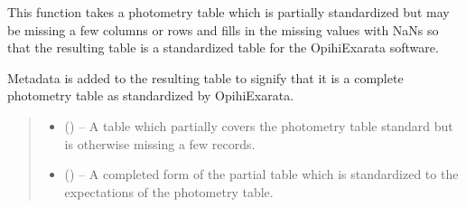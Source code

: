 \documentclass[letterpaper,11pt,english]{sphinxmanual}
\begin{document}
\begin{savenotes}\begin{fulllineitems}
\label{\detokenize{code/opihiexarata.library.phototable:opihiexarata.library.phototable.fill_incomplete_photometry_table}}
\pysigstartsignatures
{}
\pysigstopsignatures
\sphinxAtStartPar
This function takes a photometry table which is partially standardized
but may be missing a few columns or rows and fills in the missing values
with NaNs so that the resulting table is a standardized table for the
OpihiExarata software.

\sphinxAtStartPar
Metadata is added to the resulting table to signify that it is a complete
photometry table as standardized by OpihiExarata.
\begin{quote}\begin{description}
\begin{itemize}
\item {} 
\sphinxAtStartPar
{} () – A table which partially covers the photometry table standard but is
otherwise missing a few records.

\item {} 
\sphinxAtStartPar
{} () – A completed form of the partial table which is standardized to the
expectations of the photometry table.

\end{itemize}

\end{description}\end{quote}

\end{fulllineitems}\end{savenotes}


\sphinxstepscope
\end{document}

